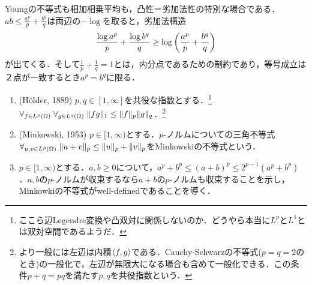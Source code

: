 \documentclass[uplatex, dvipdfmx]{jsreport}
\begin{document}
\begin{remarks}
    Youngの不等式も相加相乗平均も，凸性＝劣加法性の特別な場合である．
    $ab\le\frac{a^p}{p}+\frac{b^q}{q}$は両辺の$-\log$を取ると，劣加法構造
    \[\frac{\log a^p}{p}+\frac{\log b^q}{q}\ge\log\left(\frac{a^p}{p}+\frac{b^q}{q}\right)\]
    が出てくる．そして$\frac{1}{p}+\frac{1}{q}=1$とは，内分点であるための制約であり，等号成立は２点が一致するとき$a^p=b^q$に限る．
\end{remarks}

\begin{proposition}[ノルム不等式]\mbox{}\label{prop-norm-inequality-discrete}
    \begin{enumerate}
        \item (Hölder, 1889) $p,q\in[1,\infty]$を共役な指数とする．\footnote{ここら辺Legendre変換や凸双対に関係しないのか．どうやら本当に$L^p$と$L^1$とは双対空間であるようだ．}$\forall_{f\in L^p(\Omega)}\;\forall_{g\in L^q(\Omega)}\;\|fg\|_1\le\|f\|_p\|g\|_q$．\footnote{より一般には左辺は内積$\langle f,g\rangle$である．Cauchy-Schwarzの不等式($p=q=2$のとき)の一般化で，左辺が無限大になる場合も含めて一般化できる．この条件$p+q=pq$を満たす$p,q$を共役指数という．}
        \item (Minkowski, 1953) $p\in[1,\infty)$とする．$p$-ノルムについての三角不等式$\forall_{u,v\in L^p(\Omega)}\;\|u+v\|_p\le\|u\|_p+\|v\|_p$をMinkowskiの不等式という．
        \item $p\in[1,\infty)$とする．$a,b\ge 0$について，$a^p+b^p\le(a+b)^p\le 2^{p-1}(a^p+b^p)$．$a,b$の$p$-ノルムが収束するなら$a+b$の$p$-ノルムも収束することを示し，Minkowkiの不等式がwell-definedであることを導く．
    \end{enumerate}
\end{proposition}
\end{document}
